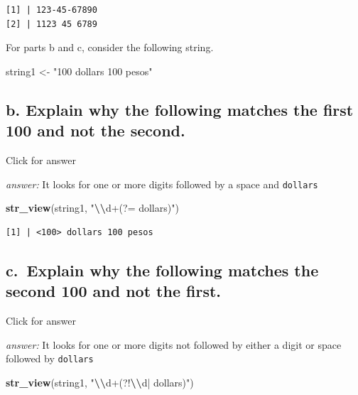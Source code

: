 \documentclass[
]{book}
\newenvironment{Shaded}{\begin{snugshade}}{\end{snugshade}}
\newcommand{\FunctionTok}[1]{\textcolor[rgb]{0.13,0.29,0.53}{\textbf{#1}}}
\newcommand{\NormalTok}[1]{#1}
\newcommand{\OtherTok}[1]{\textcolor[rgb]{0.56,0.35,0.01}{#1}}
\newcommand{\SpecialCharTok}[1]{\textcolor[rgb]{0.81,0.36,0.00}{\textbf{#1}}}
\newcommand{\StringTok}[1]{\textcolor[rgb]{0.31,0.60,0.02}{#1}}
\begin{document}
\begin{verbatim}
[1] | 123-45-67890
[2] | 1123 45 6789
\end{verbatim}

For parts b and c, consider the following string.

\begin{Shaded}
\begin{Highlighting}[]
\NormalTok{string1 }\OtherTok{\textless{}{-}} \StringTok{"100 dollars 100 pesos"}
\end{Highlighting}
\end{Shaded}

\hypertarget{b.-explain-why-the-following-matches-the-first-100-and-not-the-second.}{%
\subsection{b. Explain why the following matches the first 100 and not the second.}\label{b.-explain-why-the-following-matches-the-first-100-and-not-the-second.}}

Click for answer

\emph{answer:} It looks for one or more digits followed by a space and \texttt{dollars}

\begin{Shaded}
\begin{Highlighting}[]
\FunctionTok{str\_view}\NormalTok{(string1, }\StringTok{"}\SpecialCharTok{\textbackslash{}\textbackslash{}}\StringTok{d+(?= dollars)"}\NormalTok{)}
\end{Highlighting}
\end{Shaded}

\begin{verbatim}
[1] | <100> dollars 100 pesos
\end{verbatim}

\hypertarget{c.-explain-why-the-following-matches-the-second-100-and-not-the-first.}{%
\subsection{c.~Explain why the following matches the second 100 and not the first.}\label{c.-explain-why-the-following-matches-the-second-100-and-not-the-first.}}

Click for answer

\emph{answer:} It looks for one or more digits not followed by either a digit or space followed by \texttt{dollars}

\begin{Shaded}
\begin{Highlighting}[]
\FunctionTok{str\_view}\NormalTok{(string1, }\StringTok{"}\SpecialCharTok{\textbackslash{}\textbackslash{}}\StringTok{d+(?!}\SpecialCharTok{\textbackslash{}\textbackslash{}}\StringTok{d| dollars)"}\NormalTok{)}
\end{Highlighting}
\end{Shaded}
\end{document}
